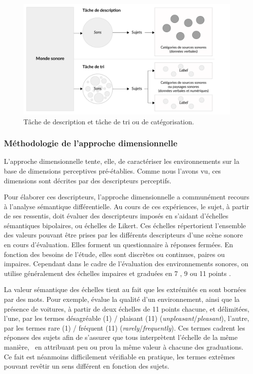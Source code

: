\begin{figure}[t]
        \myfloatalign
        \includegraphics[width=.8\linewidth]{gfx/ch_3/desCat}
        \caption{Tâche de description et tâche de tri ou de catégorisation.}\label{fig:descat}
\end{figure}


\subsubsection{Méthodologie de l'approche dimensionnelle}
\label{sec:ch3_appDimensionelle}

L'approche dimensionnelle tente, elle, de caractériser les environnements sur la base de dimensions perceptives pré-établies. Comme nous l'avons vu, ces dimensions sont décrites par des descripteurs perceptifs.

Pour élaborer ces descripteurs, l'approche dimensionnelle a communément recours à l'analyse sémantique différentielle. Au cours de ces expériences, le sujet, à partir de ses ressentis, doit évaluer des descripteurs imposés en s'aidant d'échelles sémantiques bipolaires, ou échelles de Likert. Ces échelles répertorient l'ensemble des valeurs pouvant être prises par les différents descripteurs d'une scène sonore en cours d'évaluation. Elles forment un questionnaire à réponses fermées. En fonction des besoins de l'étude, elles sont discrètes ou continues, paires ou impaires. Cependant dans le cadre de l'évaluation des environnements sonores, on utilise généralement des échelles impaires et graduées en 7 \citep{raimbault2006qualitative}, 9 \citep{hall2013exploratory} ou 11 points \citep{ricciardi2015sound}.

La valeur sémantique des échelles tient au fait que les extrémités en sont bornées par des mots. Pour exemple, \citep{ricciardi2015sound} évalue la qualité d'un environnement, ainsi que la présence de voitures, à partir de deux échelles de 11 points chacune, et délimitées, l'une, par les termes désagréable (1) / plaisant (11) (\emph{unpleasant}/\emph{pleasant}), l'autre, par les termes rare (1) / fréquent (11) (\emph{rarely}/\emph{frequently}). Ces termes cadrent les réponses des sujets afin de s'assurer que tous interprètent l'échelle de la même manière, \ie~en attribuant peu ou prou la même valeur à chacune des graduations. Ce fait est néanmoins difficilement vérifiable en pratique, les termes extrêmes pouvant revêtir un sens différent en fonction des sujets.

